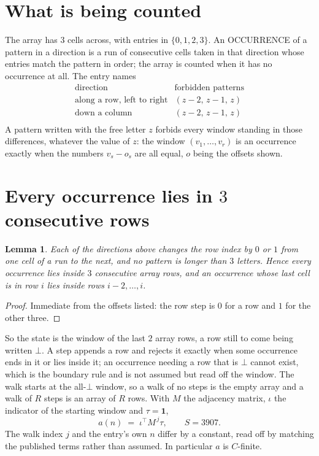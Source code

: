 \documentclass[11pt,a4paper]{article}
\theoremstyle{plain}
\newtheorem{lemma}[theorem]{Lemma}
\theoremstyle{definition}
\begin{document}
\section{What is being counted}

The array has $3$ cells across, with entries in $\{0,1,2,3\}$. An OCCURRENCE of a pattern in a
direction is a run of consecutive cells taken in that direction whose entries match the pattern
in order; the array is counted when it has no occurrence at all. The entry names
\[
\begin{array}{ll}
\text{direction} & \text{forbidden patterns} \\[2pt]
\text{along a row, left to right} & (z-2,\,z-1,\,z) \\
\text{down a column} & (z-2,\,z-1,\,z) \\
\end{array}
\]
 A pattern written with the free letter $z$ forbids every window standing in those differences, whatever the value of $z$: the window $(v_1,\dots,v_r)$ is an occurrence exactly when the numbers $v_s-o_s$ are all equal, $o$ being the offsets shown.

\section{Every occurrence lies in $3$ consecutive rows}

\begin{lemma}\label{lem:win}
Each of the directions above changes the row index by $0$ or $1$ from one cell of a run to the
next, and no pattern is longer than $3$ letters. Hence every occurrence lies inside $3$
consecutive array rows, and an occurrence whose last cell is in row $i$ lies inside rows
$i-2,\dots,i$.
\end{lemma}

\begin{proof}
Immediate from the offsets listed: the row step is $0$ for a row and $1$ for the other three.
\end{proof}

So the state is the window of the last $2$ array rows, a row still to come being written
$\bot$. A step appends a row and rejects it exactly when some occurrence ends in it or lies
inside it; an occurrence needing a row that is $\bot$ cannot exist, which is the boundary rule
and is not assumed but read off the window. The walk starts at the all-$\bot$ window, so a walk
of no steps is the empty array and a walk of $R$ steps is an array of $R$ rows. With $M$ the
adjacency matrix, $\iota$ the indicator of the starting window and $\tau=\mathbf{1}$,
\[
a(n)\;=\;\iota^{\!\top}M^{\,j}\tau ,\qquad S=3907.
\]
The walk index $j$ and the entry's own $n$ differ by a constant, read off by matching the
published terms rather than assumed. In particular $a$ is $C$-finite.
\end{document}
